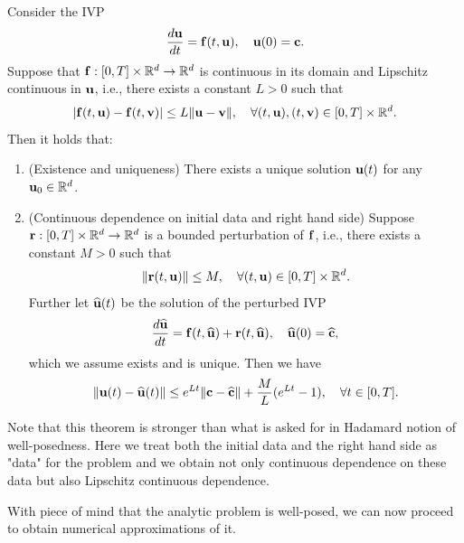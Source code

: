 \begin{theorem}
    Consider the IVP 
    \begin{equation*}
        \frac{d \mathbf{u}}{dt} = \mathbf{f} (t, \mathbf{u}), \quad \mathbf{u}(0) = \mathbf{c}.
    \end{equation*}
    Suppose that $\mathbf{f}: [0,T] \times \mathbb{R}^d \to \mathbb{R}^d$ 
    is  continuous in its domain and 
     Lipschitz continuous in $\mathbf{u}$, i.e., 
    there exists a constant $L > 0$ such that 
    \begin{equation*}
        |\mathbf{f} (t, \mathbf{u}) - \mathbf{f}(t, \mathbf{v})| \le L \|\mathbf{u} - \mathbf{v}\|, \quad \forall (t, \mathbf{u}), (t, \mathbf{v}) \in [0,T] \times \mathbb{R}^d.
    \end{equation*}
    Then it holds that: 
    \begin{enumerate}
        \item (Existence and uniqueness) 
        There exists a unique solution $\mathbf{u}(t)$ for any $\mathbf{u}_0 \in \mathbb{R}^d$.
        
        \item (Continuous dependence on initial data and right hand side) 
           Suppose $\mathbf{r}: [0,T] \times \mathbb{R}^d \to \mathbb{R}^d$ 
         is a bounded perturbation of $\mathbf{f}$, i.e., there exists a constant $M > 0$ such that 
         \begin{equation*}
            \|\mathbf{r}(t, \mathbf{u})\| \le M, \quad \forall (t, \mathbf{u}) \in [0,T] \times \mathbb{R}^d.
         \end{equation*}
         Further let $\widehat{\mathbf{u}}(t)$ be the solution of the perturbed IVP
         \begin{equation*}
            \frac{d \widehat{\mathbf{u}}}{dt} = \mathbf{f} (t, \widehat{\mathbf{u}}) 
            + \mathbf{r}(t, \widehat{\mathbf{u}}), \quad \widehat{\mathbf{u}}(0) = \widehat{\mathbf{c}},
         \end{equation*}
         which we assume exists and is unique. Then we have 
         \begin{equation*}
            \| \mathbf{u}(t) - \widehat{\mathbf{u}}(t) \| \le 
            e^{Lt} \| \mathbf{c} - \widehat{\mathbf{c}} \| + 
            \frac{M}{L} (e^{Lt} - 1), \quad \forall t \in [0, T].
         \end{equation*}
    \end{enumerate}
\end{theorem}
Note that this theorem is stronger than what is asked for in 
Hadamard notion of well-posedness. Here we treat both the 
initial data and the right hand side as "data" for the problem and 
we obtain not only continuous dependence on these data 
but also Lipschitz continuous dependence.

With piece of mind that the analytic problem is well-posed, we can now 
proceed to obtain numerical approximations of it. 

